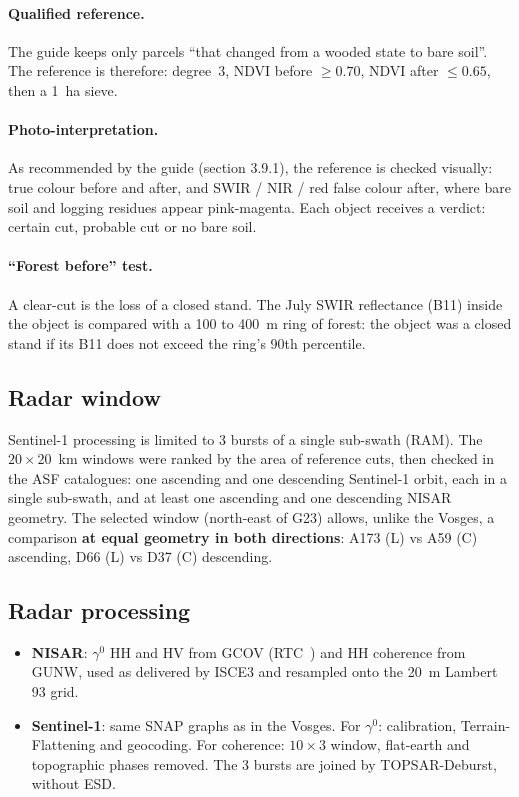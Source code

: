 \paragraph{Qualified reference.} The guide keeps only parcels \enquote{that changed from a wooded state to bare
soil}. The reference is therefore: degree~3, NDVI before $\geq 0.70$, NDVI after $\leq 0.65$, then a 1~ha sieve.

\paragraph{Photo-interpretation.} As recommended by the guide (section 3.9.1), the reference is checked visually:
true colour before and after, and SWIR / NIR / red false colour after, where bare soil and logging residues appear
pink-magenta. Each object receives a verdict: certain cut, probable cut or no bare soil.

\paragraph{\enquote{Forest before} test.} A clear-cut is the loss of a closed stand. The July SWIR reflectance
(B11) inside the object is compared with a 100 to 400~m ring of forest: the object was a closed stand if its B11
does not exceed the ring's 90th percentile.

\subsection{Radar window}

Sentinel-1 processing is limited to 3 bursts of a single sub-swath (RAM). The $20\times20$~km windows were ranked
by the area of reference cuts, then checked in the ASF catalogues: one ascending and one descending Sentinel-1
orbit, each in a single sub-swath, and at least one ascending and one descending NISAR geometry. The selected
window (north-east of G23) allows, unlike the Vosges, a comparison \textbf{at equal geometry in both directions}:
A173 (L) vs A59 (C) ascending, D66 (L) vs D37 (C) descending.

\subsection{Radar processing}

\begin{itemize}
\item \textbf{NISAR}: $\gamma^0$ HH and HV from GCOV (RTC~\cite{small2011flattening}) and HH coherence from GUNW,
  used as delivered by ISCE3 and resampled onto the 20~m Lambert 93 grid.
\item \textbf{Sentinel-1}: same SNAP graphs as in the Vosges. For $\gamma^0$: calibration, Terrain-Flattening and
  geocoding. For coherence: $10\times3$ window, flat-earth and topographic phases removed. The 3 bursts are joined
  by TOPSAR-Deburst, without ESD.
\end{itemize}

